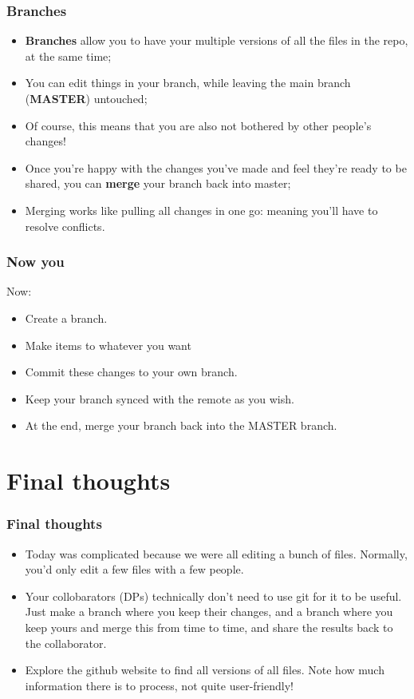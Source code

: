 \documentclass{beamer}
\begin{document}
\begin{frame}
	\frametitle{Branches}
	\begin{itemize}
		\item \textbf{Branches} allow you to have your multiple versions of all the files in the repo, at the same time;
		\item You can edit things in your branch, while leaving the main branch (\textbf{MASTER}) untouched;
		\item Of course, this means that you are also not bothered by other people's changes!
		\item Once you're happy with the changes you've made and feel they're ready to be shared, you can \textbf{merge} your branch back into master;
		\item Merging works like pulling all changes in one go: meaning you'll have to resolve conflicts.
	\end{itemize}
\end{frame}


\begin{frame}
	\frametitle{Now you}
	Now:
	\begin{itemize}
		\item Create a branch.
		\item Make items to whatever you want
		\item Commit these changes to your own branch.
		\item Keep your branch synced with the remote as you wish.
		\item At the end, merge your branch back into the MASTER branch.
	\end{itemize}
\end{frame}

\section{Final thoughts}

\begin{frame}
	\frametitle{Final thoughts}
	\begin{itemize}
		\item Today was complicated because we were all editing a bunch of files. Normally, you'd only edit a few files with a few people.
		\item Your collobarators (DPs) technically don't need to use git for it to be useful. Just make a branch where you keep their changes, and a branch where you keep yours and merge this from time to time, and share the results back to the collaborator.
		\item Explore the github website to find all versions of all files. Note how much information there is to process, not quite user-friendly!
	\end{itemize}
\end{frame}
\end{document}
